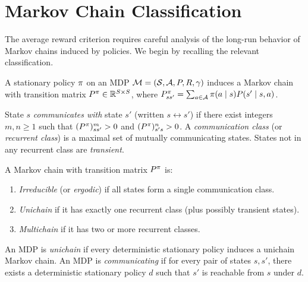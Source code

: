 \documentclass[11pt,a4paper]{article}
\begin{document}

\section{Markov Chain Classification}
\label{sec:classification}

The average reward criterion requires careful analysis of the
long-run behavior of Markov chains induced by policies. We begin
by recalling the relevant classification.

\begin{definition}
\label{def:induced-chain}
A stationary policy $\pi$ on an MDP
$\mathcal{M} = (\mathcal{S}, \mathcal{A}, P, R, \gamma)$ induces a
Markov chain with transition matrix $P^\pi \in \mathbb{R}^{S \times S}$,
where $P^\pi_{ss'} = \sum_{a \in \mathcal{A}} \pi(a \mid s)
P(s' \mid s, a)$.
\end{definition}

\begin{definition}
\label{def:communication}
State $s$ \emph{communicates with} state $s'$ (written $s
\leftrightarrow s'$) if there exist integers $m, n \geq 1$ such that
$(P^\pi)^m_{ss'} > 0$ and $(P^\pi)^n_{s's} > 0$. A
\emph{communication class} (or \emph{recurrent class}) is a maximal
set of mutually communicating states. States not in any recurrent
class are \emph{transient}.
\end{definition}

\begin{definition}
\label{def:chain-types}
A Markov chain with transition matrix $P^\pi$ is:
\begin{enumerate}[nosep]
    \item \emph{Irreducible} (or \emph{ergodic}) if all states form
    a single communication class.
    \item \emph{Unichain} if it has exactly one recurrent class
    (plus possibly transient states).
    \item \emph{Multichain} if it has two or more recurrent classes.
\end{enumerate}
An MDP is \emph{unichain} if every deterministic stationary policy
induces a unichain Markov chain. An MDP is \emph{communicating} if
for every pair of states $s, s'$, there exists a deterministic
stationary policy $d$ such that $s'$ is reachable from $s$ under $d$.
\end{definition}
\end{document}
